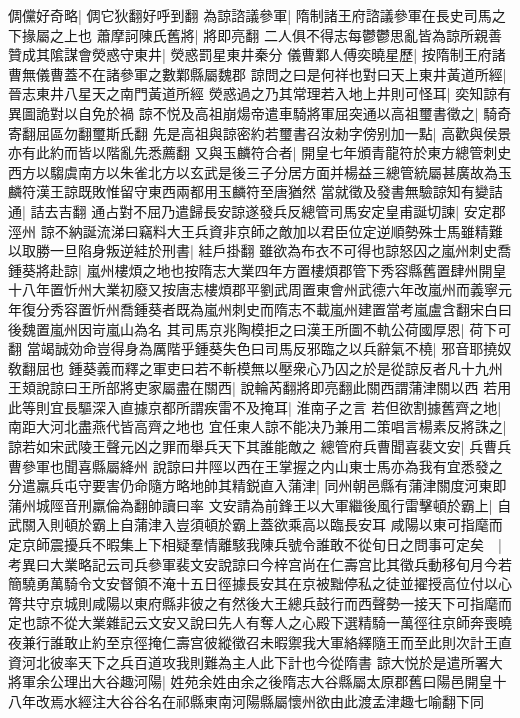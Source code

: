 倜儻好奇略|{
	倜它狄翻好呼到翻}
為諒諮議參軍|{
	隋制諸王府諮議參軍在長史司馬之下掾屬之上也}
蕭摩訶陳氏舊將|{
	將即亮翻}
二人俱不得志每鬱鬱思亂皆為諒所親善贊成其隂謀會熒惑守東井|{
	熒惑罰星東井秦分}
儀曹鄴人傅奕曉星歷|{
	按隋制王府諸曹無儀曹蓋不在諸參軍之數鄴縣屬魏郡}
諒問之曰是何祥也對曰天上東井黃道所經|{
	晉志東井八星天之南門黃道所經}
熒惑過之乃其常理若入地上井則可怪耳|{
	奕知諒有異圖詭對以自免於禍}
諒不悦及高祖崩煬帝遣車騎將軍屈突通以高祖璽書徵之|{
	騎奇寄翻屈區勿翻璽斯氏翻}
先是高祖與諒密約若璽書召汝勑字傍别加一點|{
	高歡與侯景亦有此約而皆以階亂先悉薦翻}
又與玉麟符合者|{
	開皇七年頒青龍符於東方總管刺史西方以騶虞南方以朱雀北方以玄武是後三子分居方面并楊益三總管統屬甚廣故為玉麟符漢王諒既敗惟留守東西兩都用玉麟符至唐猶然}
當就徵及發書無驗諒知有變詰通|{
	詰去吉翻}
通占對不屈乃遣歸長安諒遂發兵反總管司馬安定皇甫誕切諫|{
	安定郡涇州}
諒不納誕流涕曰竊料大王兵資非京師之敵加以君臣位定逆順勢殊士馬雖精難以取勝一旦陷身叛逆絓於刑書|{
	絓戶掛翻}
雖欲為布衣不可得也諒怒囚之嵐州刺史喬鍾葵將赴諒|{
	嵐州樓煩之地也按隋志大業四年方置樓煩郡管下秀容縣舊置肆州開皇十八年置忻州大業初廢又按唐志樓煩郡平劉武周置東會州武德六年改嵐州而義寧元年復分秀容置忻州喬鍾葵者既為嵐州刺史而隋志不載嵐州建置當考嵐盧含翻宋白曰後魏置嵐州因岢嵐山為名}
其司馬京兆陶模拒之曰漢王所圖不軌公荷國厚恩|{
	荷下可翻}
當竭誠効命豈得身為厲階乎鍾葵失色曰司馬反邪臨之以兵辭氣不橈|{
	邪音耶撓奴敎翻屈也}
鍾葵義而釋之軍吏曰若不斬模無以壓衆心乃囚之於是從諒反者凡十九州王頍說諒曰王所部將吏家屬盡在關西|{
	說輪芮翻將即亮翻此關西謂蒲津關以西}
若用此等則宜長驅深入直據京都所謂疾雷不及掩耳|{
	淮南子之言}
若但欲割據舊齊之地|{
	南距大河北盡燕代皆高齊之地也}
宜任東人諒不能决乃兼用二策唱言楊素反將誅之|{
	諒若如宋武陵王聲元凶之罪而舉兵天下其誰能敵之}
總管府兵曹聞喜裴文安|{
	兵曹兵曹參軍也聞喜縣屬絳州}
說諒曰井陘以西在王掌握之内山東士馬亦為我有宜悉發之分遣羸兵屯守要害仍命隨方略地帥其精鋭直入蒲津|{
	同州朝邑縣有蒲津關度河東即蒲州城陘音刑羸倫為翻帥讀曰率}
文安請為前鋒王以大軍繼後風行雷擊頓於霸上|{
	自武關入則頓於霸上自蒲津入豈須頓於霸上蓋欲乘高以臨長安耳}
咸陽以東可指麾而定京師震擾兵不暇集上下相疑羣情離駭我陳兵號令誰敢不從旬日之問事可定矣　|{
	考異曰大業略記云司兵參軍裴文安說諒曰今梓宫尚在仁壽宫比其徵兵動移旬月今若簡驍勇萬騎令文安督領不淹十五日徑據長安其在京被黜停私之徒並擢授高位付以心膂共守京城則咸陽以東府縣非彼之有然後大王總兵鼓行而西聲勢一接天下可指麾而定也諒不從大業雜記云文安又說曰先人有奪人之心殿下選精騎一萬徑往京師奔喪曉夜兼行誰敢止約至京徑掩仁壽宫彼縱徵召未暇禦我大軍絡繹隨王而至此則次計王直資河北彼率天下之兵百道攻我則難為主人此下計也今從隋書}
諒大悦於是遣所署大將軍余公理出大谷趣河陽|{
	姓苑余姓由余之後隋志大谷縣屬太原郡舊曰陽邑開皇十八年改焉水經注大谷谷名在祁縣東南河陽縣屬懷州欲由此渡孟津趣七喻翻下同}
